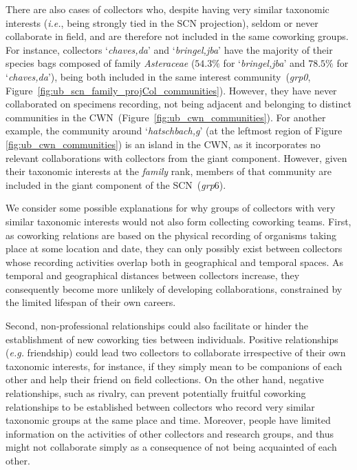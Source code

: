 There are also cases of collectors who, despite having very similar taxonomic interests (\textit{i.e.}, being strongly tied in the SCN projection), seldom or never collaborate in field, and are therefore not included in the same coworking groups. For instance, collectors
`\textit{chaves,da}' and `\textit{bringel,jba}' have the majority of their species bags composed of family \textit{Asteraceae} ($54.3\%$ for `\textit{bringel,jba}' and $78.5\%$ for `\textit{chaves,da}'), being both included in the same interest community~(\textit{grp0}, Figure~\ref{fig:ub_scn_family_projCol_communities}).
However, they have never collaborated on specimens recording, not being adjacent and belonging to distinct communities in the CWN~(Figure~\ref{fig:ub_cwn_communities}).
%
For another example, the community around `\textit{hatschbach,g}' (at the leftmost region of Figure \ref{fig:ub_cwn_communities}) is an island in the CWN, as it incorporates no relevant collaborations with collectors from the giant component.
However, given their taxonomic interests at the \textit{family} rank, members of that community are included in the giant component of the SCN~(\textit{grp$6$}).


We consider some possible explanations for why groups of collectors with very similar taxonomic interests would not also form collecting coworking teams.
%
First, as coworking relations are based on the physical recording of organisms taking place at some location and date, they can only possibly exist between collectors whose recording activities overlap both in geographical and temporal spaces.
As temporal and geographical distances between collectors increase, they consequently become more unlikely of developing collaborations, constrained by the limited lifespan of their own careers.

Second, non-professional relationships could also facilitate or hinder the establishment of new coworking ties between individuals. 
Positive relationships (\textit{e.g.} friendship) could lead two collectors to collaborate irrespective of their own taxonomic interests, for instance, if they simply mean to be companions of each other and help their friend on field collections.
On the other hand, negative relationships, such as rivalry, can prevent potentially fruitful coworking relationships to be established between collectors who record very similar taxonomic groups at the same place and time.
Moreover, people have limited information on the activities of other collectors and research groups, and thus might not collaborate simply as a consequence of not being acquainted of each other.

